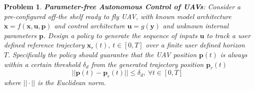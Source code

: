 \documentclass[letterpaper, 10 pt, conference]{ieeeconf}  %
\newtheorem{problem}{Problem}
\begin{document}
\begin{problem}
 \textbf{\textit{Parameter-free Autonomous Control of UAVs}}: 
Consider a pre-configured off-the shelf ready to fly UAV, with known model architecture $\dot{\bm{x}}=f(\bm{x},\bm{u},\bm{p})$ and control architecture $\bm{u}=g(\bm{y})$ and unknown internal parameters $\bm{p}$. Design a policy to generate the sequence of inputs $\bm{u}$ to track a user defined reference trajectory $\bm{x}_r(t),~ t \in [0,T]$ over a finite user defined horizon $T$. Specifically the policy should guarantee that the UAV position $\bm{p}(t)$ is always within a certain threshold $\delta_d$ from the generated trajectory position $\bm{p}_r(t)$
 \begin{equation} \label{eq:positlive}
        ||\bm{p}(t)-\bm{p}_r(t)|| \leq \delta_d,~\forall t \in [0,T]
    \end{equation}
    where $||\cdot||$ is the Euclidean norm.
\end{problem}
%
\end{document}
